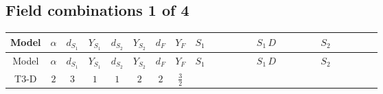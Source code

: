 \documentclass[8pt]{article}
\begin{document}
\begin{landscape}
\subsection*{Field combinations 1 of 4}
\begin{longtable}{@{}cccccccc >{\raggedright\arraybackslash}p{0.21\linewidth} >{\raggedright\arraybackslash}p{0.21\linewidth} >{\raggedright\arraybackslash}p{0.21\linewidth}@{}}
\toprule
Model & $\alpha$ & $d_{S_1}$ & $Y_{S_1}$ & $d_{S_2}$ & $Y_{S_2}$ & $d_F$ & $Y_F$ & $S_1$ & $S_1\,D$ & $S_2$ \\
\midrule
\endfirsthead
\toprule
Model & $\alpha$ & $d_{S_1}$ & $Y_{S_1}$ & $d_{S_2}$ & $Y_{S_2}$ & $d_F$ & $Y_F$ & $S_1$ & $S_1\,D$ & $S_2$ \\
\midrule
\endhead
T3-D & $2$ & $3$ & $1$ & $1$ & $2$ & $2$ & $\frac{3}{2}$ & \scriptsize\adjustbox{max width=\linewidth}{$\begin{gathered} -S_{1,j_1} S_{1,j_1}{}^{\dagger } m_1^2 \\ +\frac{1}{2} S_{1,j_3} S_{1,j_4} S_{1,j_1}{}^{\dagger } S_{1,j_2}{}^{\dagger } \mathcal{I}_{S_1,j_1,j_3,j_2,j_4}{}^1 \lambda_{S_1}^{(1)}^{(1)} \\ +\frac{1}{2} S_{1,j_3} S_{1,j_4} S_{1,j_1}{}^{\dagger } S_{1,j_2}{}^{\dagger } \mathcal{I}_{S_1,j_1,j_3,j_2,j_4}{}^2 \lambda_{S_1}^{(1)}^{(2)}\end{gathered}$} & \scriptsize\adjustbox{max width=\linewidth}{$\begin{gathered} +D_{\mu _1}\left(S_{1,j_1}\right){}^{\dagger } D_{\mu _1}\left(S_{1,j_1}\right)\end{gathered}$} & \scriptsize\adjustbox{max width=\linewidth}{$\begin{gathered} -m_2^2 S_2 S_2{}^{\dagger } \\ +\frac{1}{2} S_2^2 \left(S_2{}^{\dagger }\right){}^2 \lambda_{S_2}^{(1)}^{(1)}\end{gathered}$} \\
\midrule
\bottomrule
\end{longtable}
\clearpage

\end{landscape}
\end{document}
